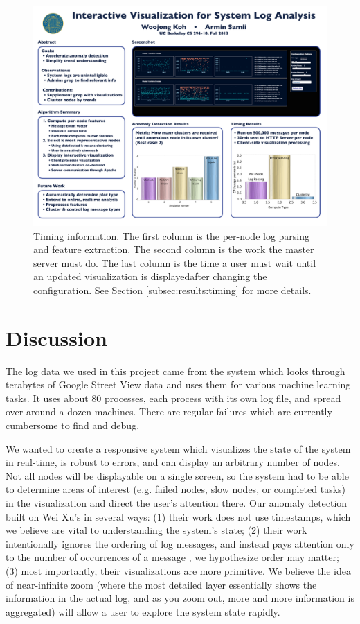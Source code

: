 \documentclass[conference]{style/acmsiggraph}
\begin{document}
\begin{figure}[t]
    \centering
    \includegraphics[width=1.0\columnwidth]{images/timing.pdf}
    \caption{Timing information. The first column is the per-node log parsing and feature extraction. The second column is the work the master server must do. The last column is the time a user must wait until an updated visualization is displayedafter changing the configuration. See Section \ref{subsec:results:timing} for more details.}
    \label{fig:timings}
\end{figure}


\section{Discussion}

The log data we used in this project came from the system which looks through terabytes of Google
Street View data and uses them for various machine learning tasks. It uses about 80 processes, each
process with its own log file, and spread over around a dozen machines. There are regular failures
which are currently cumbersome to find and debug.

We wanted to create a responsive system which visualizes the state of the system in real-time, is
robust to errors, and can display an arbitrary number of nodes. Not all nodes will be displayable on
a single screen, so the system had to be able to determine areas of interest (e.g. failed nodes,
slow nodes, or completed tasks) in the visualization and direct the user’s attention there. Our
anomaly detection built on Wei Xu's in several ways: (1) their work does not use timestamps, which
we believe are vital to understanding the system’s state; (2) their work intentionally ignores the
ordering of log messages, and instead pays attention only to the number of occurrences of a message
, we hypothesize order may matter; (3) most importantly, their visualizations are more primitive. We
believe the idea of near-infinite zoom (where the most detailed layer essentially shows the
information in the actual log, and as you zoom out, more and more information is aggregated) will
allow a user to explore the system state rapidly.
\end{document}
